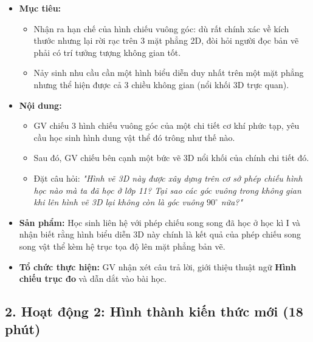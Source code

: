 \documentclass[12pt, a4paper]{article}
\begin{document}
\begin{itemize}[leftmargin=1.2cm]
    \item[a)] \textbf{Mục tiêu:}
    \begin{itemize}[leftmargin=0.6cm]
        \item Nhận ra hạn chế của hình chiếu vuông góc: dù rất chính xác về kích thước nhưng lại rời rạc trên 3 mặt phẳng 2D, đòi hỏi người đọc bản vẽ phải có trí tưởng tượng không gian tốt.
        \item Nảy sinh nhu cầu cần một hình biểu diễn duy nhất trên một mặt phẳng nhưng thể hiện được cả 3 chiều không gian (nổi khối 3D trực quan).
    \end{itemize}

    \item[b)] \textbf{Nội dung:}
    \begin{itemize}[leftmargin=0.6cm]
        \item GV chiếu 3 hình chiếu vuông góc của một chi tiết cơ khí phức tạp, yêu cầu học sinh hình dung vật thể đó trông như thế nào.
        \item Sau đó, GV chiếu bên cạnh một bức vẽ 3D nổi khối của chính chi tiết đó.
        \item Đặt câu hỏi: \textit{"Hình vẽ 3D này được xây dựng trên cơ sở phép chiếu hình học nào mà ta đã học ở lớp 11? Tại sao các góc vuông trong không gian khi lên hình vẽ 3D lại không còn là góc vuông $90^\circ$ nữa?"}
    \end{itemize}

    \item[c)] \textbf{Sản phẩm:} Học sinh liên hệ với phép chiếu song song đã học ở học kì I và nhận biết rằng hình biểu diễn 3D này chính là kết quả của phép chiếu song song vật thể kèm hệ trục tọa độ lên mặt phẳng bản vẽ.
    \item[d)] \textbf{Tổ chức thực hiện:} GV nhận xét câu trả lời, giới thiệu thuật ngữ \textbf{Hình chiếu trục đo} và dẫn dắt vào bài học.
\end{itemize}

\subsection*{2. Hoạt động 2: Hình thành kiến thức mới (18 phút)}
\end{document}

